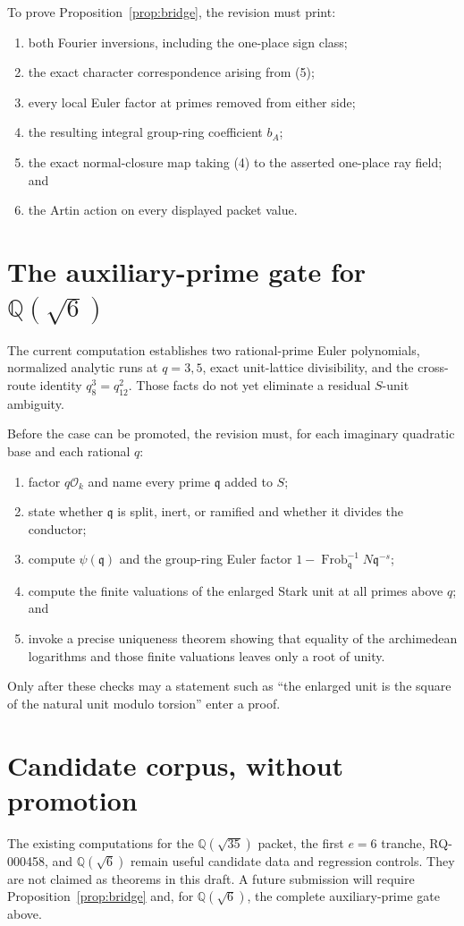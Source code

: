 \documentclass[11pt]{article}
\newcommand{\Q}{\mathbb Q}
\begin{document}
To prove Proposition~\ref{prop:bridge}, the revision must print:

\begin{enumerate}
\item both Fourier inversions, including the one-place sign class;
\item the exact character correspondence arising from (5);
\item every local Euler factor at primes removed from either side;
\item the resulting integral group-ring coefficient \(b_A\);
\item the exact normal-closure map taking (4) to the asserted
one-place ray field; and
\item the Artin action on every displayed packet value.
\end{enumerate}

\section{The auxiliary-prime gate for
\texorpdfstring{\(\Q(\sqrt6)\)}{Q(sqrt(6))}}

The current computation establishes two rational-prime Euler
polynomials, normalized analytic runs at \(q=3,5\), exact
unit-lattice divisibility, and the cross-route identity
\(q_8^3=q_{12}^2\).  Those facts do not yet eliminate a residual
\(S\)-unit ambiguity.

Before the case can be promoted, the revision must, for each
imaginary quadratic base and each rational \(q\):

\begin{enumerate}
\item factor \(q\mathcal O_k\) and name every prime
\(\mathfrak q\) added to \(S\);
\item state whether \(\mathfrak q\) is split, inert, or ramified and
whether it divides the conductor;
\item compute \(\psi(\mathfrak q)\) and the group-ring Euler factor
\(1-\operatorname{Frob}_{\mathfrak q}^{-1}N\mathfrak q^{-s}\);
\item compute the finite valuations of the enlarged Stark unit at
all primes above \(q\); and
\item invoke a precise uniqueness theorem showing that equality of
the archimedean logarithms and those finite valuations leaves only a
root of unity.
\end{enumerate}

Only after these checks may a statement such as
``the enlarged unit is the square of the natural unit modulo
torsion'' enter a proof.

\section{Candidate corpus, without promotion}

The existing computations for the \(\Q(\sqrt{35})\) packet, the first
\(e=6\) tranche, RQ-000458, and \(\Q(\sqrt6)\) remain useful candidate
data and regression controls.  They are not claimed as theorems in
this draft.  A future submission will require
Proposition~\ref{prop:bridge} and, for \(\Q(\sqrt6)\), the complete
auxiliary-prime gate above.
\end{document}

